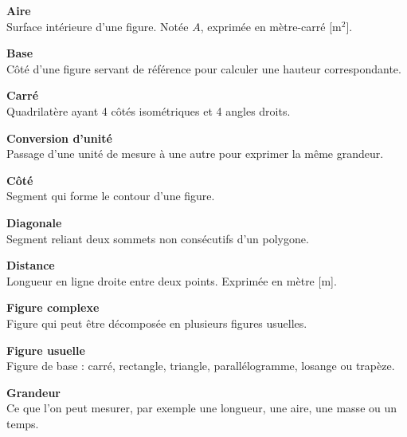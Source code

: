  \vfill
\begin{tcbraster}[raster columns=2, raster equal height, raster valign=top,raster column skip=2mm, raster row skip=2mm]
\begin{terme}
\textbf{\large Aire}\\[2pt]
{\small Surface intérieure d'une figure. Notée $A$, exprimée en mètre-carré [m$^2$].}
\end{terme}
\begin{terme}
\textbf{\large Base}\\[2pt]
{\small Côté d'une figure servant de référence pour calculer une hauteur correspondante.}
\end{terme}
\begin{terme}
\textbf{\large Carré}\\[2pt]
{\small Quadrilatère ayant 4 côtés isométriques et 4 angles droits.}
\end{terme}
\begin{terme}
\textbf{\large Conversion d'unité}\\[2pt]
{\small Passage d'une unité de mesure à une autre pour exprimer la même grandeur.}
\end{terme}
\begin{terme}
\textbf{\large Côté}\\[2pt]
{\small Segment qui forme le contour d'une figure.}
\end{terme}
\begin{terme}
\textbf{\large Diagonale}\\[2pt]
{\small Segment reliant deux sommets non consécutifs d'un polygone.}
\end{terme}
\begin{terme}
\textbf{\large Distance}\\[2pt]
{\small Longueur en ligne droite entre deux points. Exprimée en mètre [m].}
\end{terme}
\begin{terme}
\textbf{\large Figure complexe}\\[2pt]
{\small Figure qui peut être décomposée en plusieurs figures usuelles.}
\end{terme}
\begin{terme}
\textbf{\large Figure usuelle}\\[2pt]
{\small Figure de base : carré, rectangle, triangle, parallélogramme, losange ou trapèze.}
\end{terme}
\begin{terme}
\textbf{\large Grandeur}\\[2pt]
{\small Ce que l'on peut mesurer, par exemple une longueur, une aire, une masse ou un temps.}

\end{terme}
\end{tcbraster}
